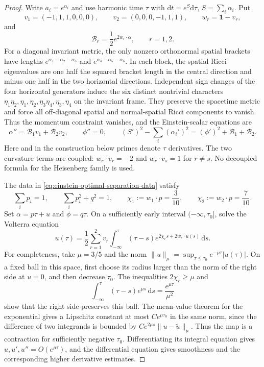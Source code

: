 \documentclass[10pt,a4paper]{article}
\numberwithin{equation}{section}
\theoremstyle{definition}
\theoremstyle{remark}
\newcommand{\dd}{\mathrm d}
\begin{document}
\begin{proof}
Write $a_i=e^{\alpha_i}$ and use harmonic time $\tau$ with
$\dd t=e^S\dd\tau$, $S=\sum_i\alpha_i$.  Put
\[
 v_1=(-1,1,1,0,0,0),\qquad
 v_2=(0,0,0,-1,1,1),\qquad
 w_r=\mathbf1-v_r,
\]
and
\[
 \mathcal B_r=\frac12 e^{2w_r\cdot\alpha},\qquad r=1,2.
\]
For a diagonal invariant metric, the only nonzero orthonormal
spatial brackets have lengths
$e^{\alpha_1-\alpha_2-\alpha_3}$ and
$e^{\alpha_4-\alpha_5-\alpha_6}$.  In each block, the spatial Ricci
eigenvalues are one half the squared bracket length in the central
direction and minus one half in the two horizontal directions.
Independent sign changes of the four horizontal generators induce
the six distinct nontrivial characters
$\eta_1\eta_2,\eta_1,\eta_2,\eta_3\eta_4,\eta_3,\eta_4$
on the invariant frame.  They preserve the spacetime metric and
force all off-diagonal spatial and normal-spatial Ricci components
to vanish.  Thus the momentum constraint vanishes, and the
Einstein-scalar equations are
\begin{equation}
 \alpha''=\mathcal B_1v_1+\mathcal B_2v_2,
 \qquad \phi''=0,
 \qquad
 (S')^2-\sum_i(\alpha_i')^2
       = (\phi')^2+\mathcal B_1+\mathcal B_2.
 \label{eq:einstein-product-heisenberg-ode}
\end{equation}
Here and in the construction below primes denote $\tau$ derivatives.
The two curvature terms are coupled:
$w_r\cdot v_r=-2$ and $w_r\cdot v_s=1$ for $r\ne s$.
No decoupled formula for the Heisenberg family is used.

The data in \eqref{eq:einstein-optimal-separation-data} satisfy
\[
 \sum_i p_i=1,\qquad \sum_i p_i^2+q^2=1,\qquad
 \chi_1:=w_1\cdot p=\frac3{10},\qquad
 \chi_2:=w_2\cdot p=\frac7{10}.
\]
Set $\alpha=p\tau+u$ and $\phi=q\tau$.  On a sufficiently early
interval $(-\infty,\tau_0]$, solve the Volterra equation
\begin{equation}
 u(\tau)=\frac12\sum_{r=1}^2v_r
   \int_{-\infty}^{\tau}(\tau-s)
     e^{2\chi_rs+2w_r\cdot u(s)}\,\dd s.
 \label{eq:einstein-product-heisenberg-volterra}
\end{equation}
For completeness, take $\mu=3/5$ and the norm
$\|u\|_\mu=\sup_{\tau\le\tau_0}e^{-\mu\tau}|u(\tau)|$.
On a fixed ball in this space, first choose its radius larger than
the norm of the right side at $u=0$, and then decrease $\tau_0$.
The inequalities $2\chi_r\ge\mu$ and
\[
 \int_{-\infty}^{\tau}(\tau-s)e^{\mu s}\,\dd s
       =\frac{e^{\mu\tau}}{\mu^2}
\]
show that the right side preserves this ball.  The mean-value theorem
for the exponential gives a Lipschitz constant at most
$C e^{\mu\tau_0}$ in the same norm, since the difference of two
integrands is bounded by
$C e^{2\mu s}\|u-\widetilde u\|_\mu$.
Thus the map is a contraction for sufficiently negative $\tau_0$.
Differentiating its integral equation gives
$u,u',u''=O(e^{\mu\tau})$, and the differential equation gives
smoothness and the corresponding higher derivative estimates.


\end{proof}
\end{document}
